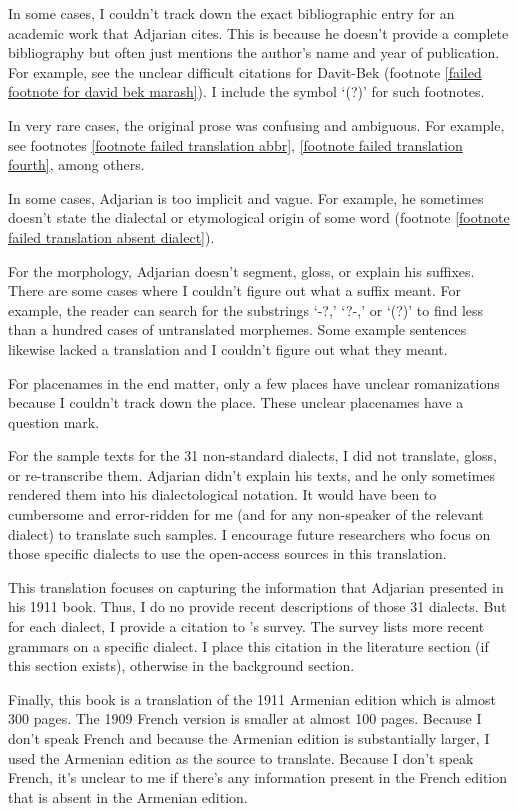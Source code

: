 In some cases, I couldn't track down the exact bibliographic entry for an academic work that Adjarian cites. This is because he doesn't provide a complete bibliography but often just mentions the author's name and year of publication. For example, see the unclear   difficult citations   for  Davit-Bek (footnote \ref{failed footnote for david bek marash}). I include the symbol `(?)' for such footnotes.

In very rare cases, the original prose was confusing and ambiguous. For example, see footnotes \ref{footnote failed translation abbr}, \ref{footnote failed translation fourth},  among others.

In some cases, Adjarian is too implicit and vague. For example, he sometimes doesn't state the dialectal or etymological origin of  some word (footnote  \ref{footnote failed translation absent dialect}). 



For the morphology,        Adjarian doesn't segment, gloss, or explain his suffixes. There are some cases where I couldn't figure out what a suffix meant. For    example, the reader can search for the substrings `-?,'  `?-,' or `(?)' to find less than a hundred cases of untranslated morphemes. Some example sentences likewise lacked a translation and I couldn't figure out what they meant. 

For placenames in the end matter, only a few places have unclear romanizations because I couldn't track down the place. These unclear placenames have a question mark. 

For the sample texts for the 31 non-standard dialects, I did not translate, gloss, or re-transcribe them. Adjarian didn't   explain his texts, and he only sometimes rendered them into his dialectological notation. It would have been to cumbersome and error-ridden for me (and for any non-speaker of the relevant dialect) to translate such samples. I encourage future researchers who focus on those specific dialects to use the open-access sources in this translation. 

This translation focuses on capturing the information that Adjarian presented in his 1911 book. Thus, I do no provide recent descriptions of those 31 dialects. But for each dialect, I provide a citation to \citet{Martirosyan-2019-ArmenianDialectsBigVersionRussianJournal}'s survey. The survey lists more recent grammars on a specific dialect. I place this citation  in the literature section (if this section exists), otherwise in the background section. 

Finally, this book is a translation of the 1911 Armenian edition which is almost 300 pages. The 1909 French version is smaller at almost 100 pages. Because I don't speak French and because the Armenian edition is substantially larger, I used the Armenian edition as the source to translate. Because I don't speak French, it's unclear to me if there's any information present in the French edition that is absent in the Armenian edition. 






